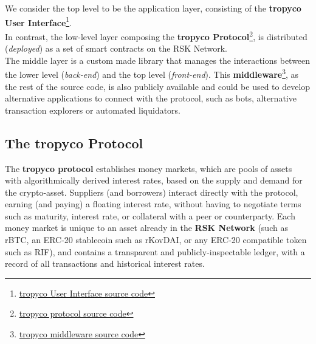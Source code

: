 \documentclass{article}
\begin{document}
We consider the top level to be the application layer, consisting of the \textbf{tropyco User Interface}\footnote{\href{https://github.com/riflending/tropyco-ui}{tropyco User Interface source code}}.
\\
In contrast, the low-level layer composing the \textbf{tropyco Protocol}\footnote{\href{https://github.com/riflending/tropyco-protocol}{tropyco protocol source code}}, is distributed (\textit{deployed}) as a set of smart contracts on the RSK Network.
\\
The middle layer is a custom made library that manages the interactions between the lower level (\textit{back-end}) and the top level (\textit{front-end}). This \textbf{middleware}\footnote{\href{https://github.com/riflending/tropyco-ui/src/components/middleware}{tropyco middleware source code}}, as the rest of the source code, is also publicly available and could be used to develop alternative applications to connect with the protocol, such as bots, alternative transaction explorers or automated liquidators.

\subsection{The tropyco Protocol}

The \textbf{tropyco protocol} establishes money markets, which are pools of assets with algorithmically derived interest rates, based on the supply and demand for the
crypto-asset. Suppliers (and borrowers) interact directly with the protocol, earning (and paying) a floating interest rate, without having to negotiate terms such as maturity, interest rate, or collateral with a peer or counterparty.
Each money market is unique to an asset already in the \textbf{RSK Network} (such as rBTC, an ERC-20 stablecoin such as rKovDAI, or any ERC-20 compatible token such as RIF), and contains a transparent and publicly-inspectable ledger, with a record of all transactions and historical interest rates.

\end{document}
